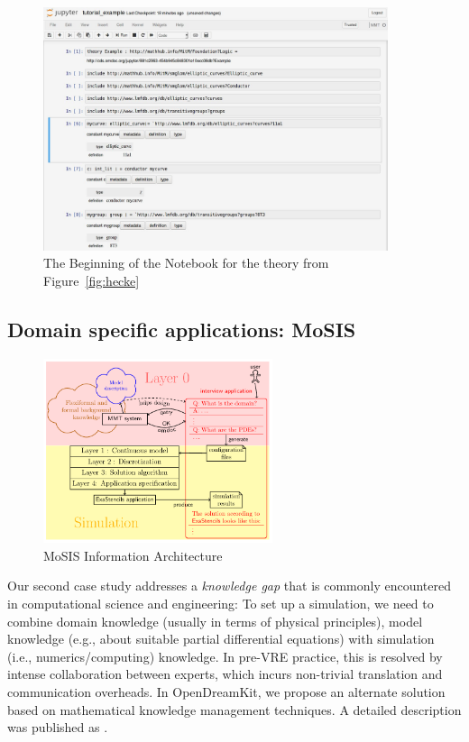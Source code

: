 \begin{figure}[ht]\centering
  \includegraphics[width=0.9\textwidth]{../D4.11/lmfdb_example}
  \caption{The Beginning of the Notebook for the theory from Figure~\ref{fig:hecke}}\label{fig:lmfdbexample}
\end{figure}

\subsection{Domain specific applications: MoSIS}

\begin{figure}[ht]\centering
  \includegraphics[width=0.6\textwidth]{../D4.11/proto}
  \caption{MoSIS Information Architecture}\label{fig:prototype}
\end{figure}

Our second case study addresses a \emph{knowledge gap} that is commonly encountered in computational science and engineering:
To set up a simulation, we need to combine domain knowledge (usually in terms of physical principles), model knowledge (e.g., about suitable partial differential equations) with simulation (i.e., numerics/computing) knowledge.
In pre-VRE practice, this is resolved by intense collaboration between experts, which incurs non-trivial translation and communication overheads.
In OpenDreamKit, we propose an alternate solution based on mathematical knowledge management techniques.
A detailed description was published as \cite{PolKohKoe:kacse18}.

